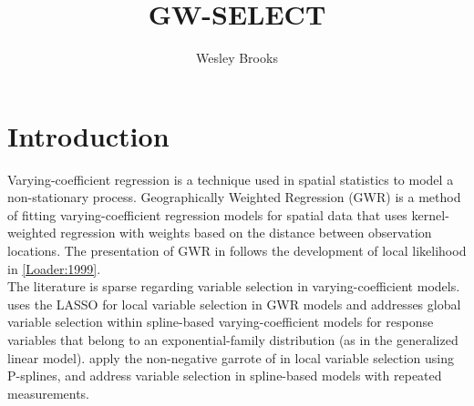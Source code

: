 \documentclass[authoryear, review, 11pt]{elsarticle}
\title{GW-SELECT}
\author{Wesley Brooks}
\date{}                                           %
\begin{document}
\maketitle





\section{Introduction}
	Varying-coefficient regression \cite{Hastie:1993} is a technique used in spatial statistics to model a non-stationary process. Geographically Weighted Regression (GWR) \cite{Fotheringham:2002} is a method of fitting varying-coefficient regression models for spatial data that uses kernel-weighted regression with weights based on the distance between observation locations. The presentation of GWR in \cite{Fotheringham:2002} follows the development of local likelihood in \ref{Loader:1999}.\\
	
	The literature is sparse regarding variable selection in varying-coefficient models. \cite{Wheeler:2009} uses the LASSO for local variable selection in GWR models and \cite{Fan:1999} addresses global variable selection within spline-based varying-coefficient models for response variables that belong to an exponential-family distribution (as in the generalized linear model). \cite{Antoniadis:2011} apply the non-negative garrote of \cite{Breiman:1995} in local variable selection using P-splines, and \cite{Wang:2008} address variable selection in spline-based models with repeated measurements.\\
	

	
\end{document}
